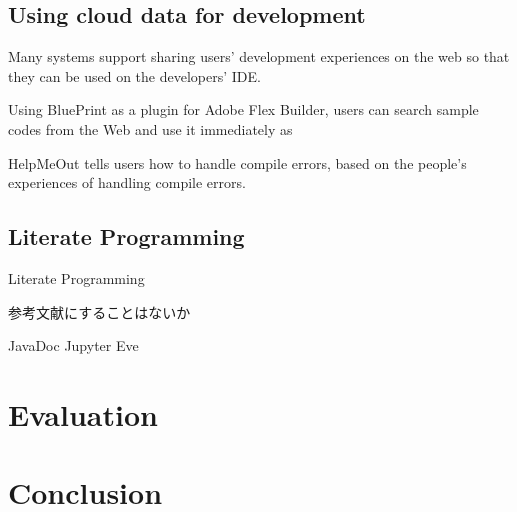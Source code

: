 \documentclass{sigchi}
\begin{document}
\subsection{Using cloud data for development}


Many systems support sharing users' development experiences on the web so that
they can be used on the developers' IDE.

Using BluePrint\cite{Brandt:2010:EPI:1753326.1753402}
as a plugin for Adobe Flex Builder,
users can search sample codes from the Web and use it immediately
as 


HelpMeOut\cite{Hartmann:2010:OPS:1753326.1753478} tells users
how to handle compile errors,
based on the people's experiences of handling compile errors.



% 
%

\subsection{Literate Programming}

Literate Programming\cite{Knuth}

参考文献にすることはないか

JavaDoc
Jupyter
Eve

\section{Evaluation}

\section{Conclusion}




\end{document}
